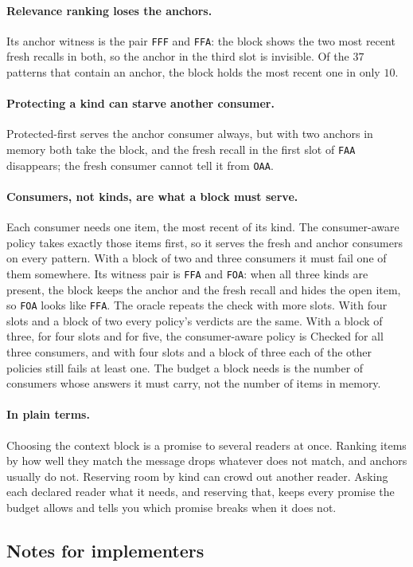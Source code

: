 \documentclass[11pt]{article}
\newcommand{\code}[1]{\texttt{#1}}
\newcommand{\plain}{\paragraph{In plain terms.}}
\theoremstyle{definition}
\theoremstyle{plain}
\begin{document}
\paragraph{Relevance ranking loses the anchors.} Its anchor witness is the pair \code{FFF} and
\code{FFA}: the block shows the two most recent fresh recalls in both, so the anchor in the third
slot is invisible. Of the $37$ patterns that contain an anchor, the block holds the most recent one
in only $10$.

\paragraph{Protecting a kind can starve another consumer.} Protected-first serves the anchor
consumer always, but with two anchors in memory both take the block, and the fresh recall in the
first slot of \code{FAA} disappears; the fresh consumer cannot tell it from \code{OAA}.

\paragraph{Consumers, not kinds, are what a block must serve.} Each consumer needs one item, the
most recent of its kind. The consumer-aware policy takes exactly those items first, so it serves the
fresh and anchor consumers on every pattern. With a block of two and three consumers it must fail one
of them somewhere. Its witness pair is \code{FFA} and \code{FOA}: when all three kinds are present,
the block keeps the anchor and the fresh recall and hides the open item, so \code{FOA} looks like
\code{FFA}. The oracle repeats the check with more slots. With four slots and a block of two every
policy's verdicts are the same. With a block of three, for four slots and for five, the consumer-aware policy is Checked
for all three consumers, and with four slots and a block of three each of the other policies still
fails at least one. The budget a block needs is the number of consumers
whose answers it must carry, not the number of items in memory.

\plain Choosing the context block is a promise to several readers at once. Ranking items by how
well they match the message drops whatever does not match, and anchors usually do not. Reserving
room by kind can crowd out another reader. Asking each declared reader what it needs, and
reserving that, keeps every promise the budget allows and tells you which promise breaks
when it does not.

\subsection{Notes for implementers}
\end{document}
